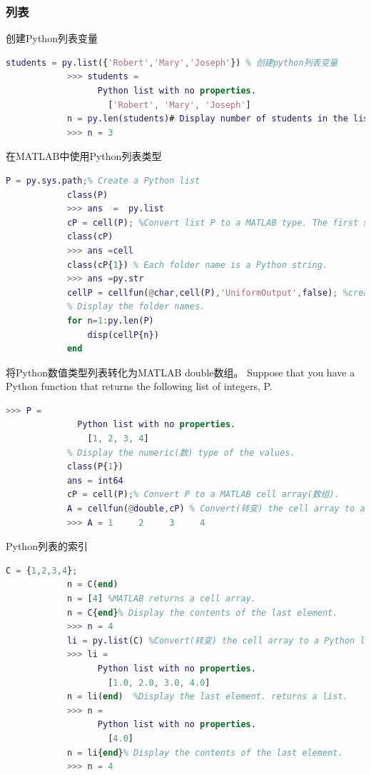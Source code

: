         \subsubsection{列表}
            \par
            创建Python列表变量
            \begin{lstlisting}[language = Matlab]
            students = py.list({'Robert','Mary','Joseph'}) % 创建python列表变量
            >>> students =
                  Python list with no properties.
                    ['Robert', 'Mary', 'Joseph']
            n = py.len(students)# Display number of students in the list.
            >>> n = 3
            \end{lstlisting}
            在MATLAB中使用Python列表类型
            \begin{lstlisting}[language  = Matlab]
            P = py.sys.path;% Create a Python list
            class(P)
            >>> ans  =  py.list
            cP = cell(P); %Convert list P to a MATLAB type. The first step is to convert(转变) the list to a cell array(数组) of folder names, cP.
            class(cP)
            >>> ans =cell
            class(cP{1}) % Each folder name is a Python string.
            >>> ans =py.str
            cellP = cellfun(@char,cell(P),'UniformOutput',false); %create cellP using the cellfun function to combine the conversion(转换) functions.
            % Display the folder names.
            for n=1:py.len(P)
                disp(cellP{n})
            end
            \end{lstlisting}
            将Python数值类型列表转化为MATLAB double数组。
            Suppose that you have a Python function that returns the following list of integers, P.
            \begin{lstlisting}[language = Matlab]
            >>> P =
              Python list with no properties.
                [1, 2, 3, 4]
            % Display the numeric(数) type of the values.
            class(P{1})
            ans = int64
            cP = cell(P);% Convert P to a MATLAB cell array(数组).
            A = cellfun(@double,cP) % Convert(转变) the cell array to a MATLAB array of double.
            >>> A = 1     2     3     4
            \end{lstlisting}
            Python列表的索引
            \begin{lstlisting}[language = Matlab]
            C = {1,2,3,4};
            n = C(end)
            n = [4] %MATLAB returns a cell array.
            n = C{end}% Display the contents of the last element.
            >>> n = 4
            li = py.list(C) %Convert(转变) the cell array to a Python list.
            >>> li =
                  Python list with no properties.
                    [1.0, 2.0, 3.0, 4.0]
            n = li(end)  %Display the last element. returns a list.
            >>> n =
                  Python list with no properties.
                    [4.0]
            n = li{end}% Display the contents of the last element.
            >>> n = 4
            \end{lstlisting}

